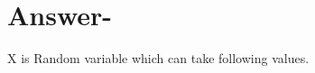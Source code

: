 \documentclass[journal,12pt,twocolumn]{IEEEtran}
\begin{document}
\section{Answer-}
    X is Random variable which can take following values. 
    \begin{table}[htb]
        \tiny
        \caption{}
        \end{table}
\end{document}
